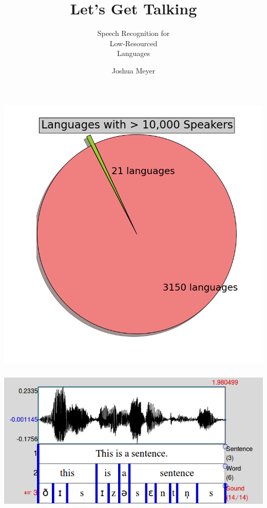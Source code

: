\documentclass[pdflatex,compress]{beamer}
\title{Let's Get Talking}
\subtitle{Speech Recognition for \\Low-Resourced\\Languages}
\author{Joshua Meyer}
\begin{document}
\maketitle




\begin{frame}
  \frametitle{}
  \centering
  \begin{center}
    \includegraphics[width=\textwidth,height=0.8\textheight,keepaspectratio]{siri.png}
  \end{center}
\end{frame}

\begin{frame}
  \frametitle{}
  \centering
  \begin{center}
    \includegraphics[width=\textwidth,height=0.8\textheight,keepaspectratio]{sentence.png}
  \end{center}
\end{frame}
\end{document}
